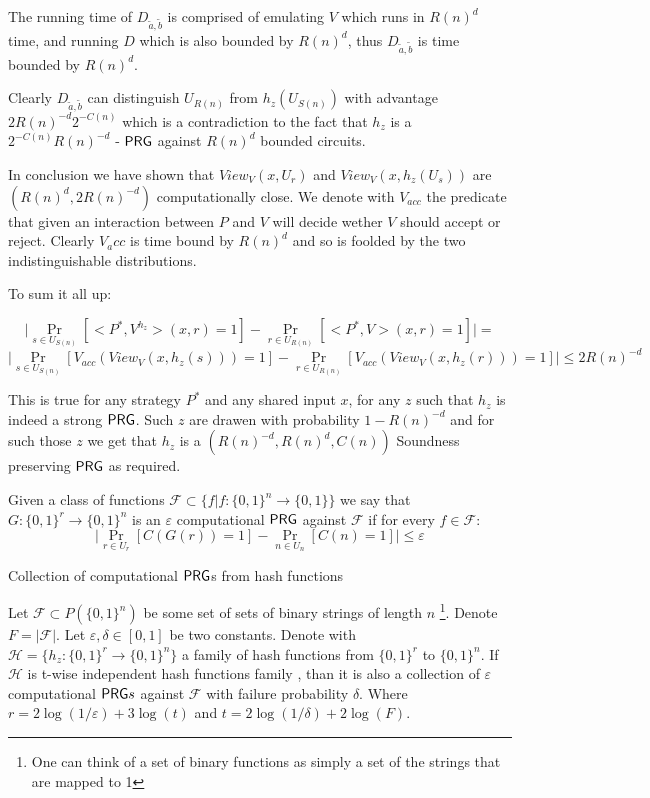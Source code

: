 \documentclass[11]{article}
\newenvironment{proof}[1][Proof]{\begin{trivlist}
\item[\hskip \labelsep {\bfseries #1}]}{\end{trivlist}}
\begin{document}
\begin{proof}
The running time of $D_{\tilde{a}, \tilde{b}}$ is comprised of emulating $V$ which runs in $R(n)^d$ time, and running $D$ which is also bounded by $R(n)^d$, thus $D_{\tilde{a}, \tilde{b}}$ is time bounded by $R(n)^d$.

Clearly $D_{\tilde{a}, \tilde{b}}$ can distinguish $U_{R(n)}$ from $h_z(U_{S(n)})$ with advantage $2R(n)^{-d} 2^{-C(n)}$ which is a contradiction to the fact that $h_z$ is a $2^{-C(n)} R(n)^{-d}$ - $\mathsf{PRG}$ against $R(n)^d$ bounded circuits.

In conclusion we have shown that $View_V(x,U_r)$ and $View_V(x, h_z(U_s))$ are $(R(n)^d, 2R(n)^{-d})$ computationally close. We denote with $V_{acc}$ the predicate that given an interaction between $P$ and $V$ will decide wether $V$ should accept or reject. Clearly $V_acc$ is time bound by $R(n)^d$ and so is foolded by the two indistinguishable distributions.

To sum it all up:

$$ \bigg| \Pr_{s \in U_{S(n)}} [<P^*, V^{h_z}>(x, r) = 1] - \Pr_{r \in U_{R(n)}}[<P^*, V>(x,r) = 1] \bigg| = $$
$$ \bigg| \Pr_{s \in U_{S(n)}} [V_{acc}(View_V(x, h_z(s))) = 1] - \Pr_{r \in U_{R(n)}} [V_{acc}(View_V(x, h_z(r))) = 1] \bigg| \leq 2R(n)^{-d}$$

This is true for any strategy $P^*$ and any shared input $x$, for any $z$ such that $h_z$ is indeed a strong $\mathsf{PRG}$. Such $z$ are drawen with probability $1 - R(n)^{-d}$ and for such those $z$ we get that $h_z$ is a $(R(n)^{-d}, R(n)^d, C(n))$ Soundness preserving $\mathsf{PRG}$ as required.

\end{proof}


Given a class of functions $\mathcal{F} \subset \{f | f: \{0,1\}^n \to \{0,1\}\}$ we say that $G: \{0,1\}^r \to \{0,1\}^n$ is an $\varepsilon$ computational $\mathsf{PRG}$ against $\mathcal{F}$ if for every $f \in \mathcal{F}$:
$$ \bigg| \Pr_{r \in U_r}[C(G(r)) = 1] - \Pr_{n \in U_n}[C(n) = 1] \bigg| \leq \varepsilon$$

\begin{claim} {Collection of computational $\mathsf{PRG}$s from hash functions}

Let $\mathcal{F} \subset P(\{0,1\}^n)$ be some set of sets of binary strings of length $n$ \footnote{One can think of a set of binary functions as simply a set of the strings that are mapped to 1}. Denote $F = |\mathcal{F}|$. Let $\varepsilon, \delta \in [0,1]$ be two constants. Denote with $\mathcal{H} = \{ h_z : \{0,1\}^r \to \{0,1 \}^n \}$ a family of hash functions from $\{0,1\}^r$ to $\{0,1\}^n$. If $\mathcal{H}$ is t-wise independent hash functions family , than it is also a collection of $\varepsilon$ computational $\mathsf{PRG} s$ against $\mathcal{F}$ with failure probability $\delta$. Where $r = 2\log(1 / \varepsilon) + 3\log(t)$ and $t = 2\log(1 / \delta) + 2\log (F)$.
\end{claim}
\end{document}
